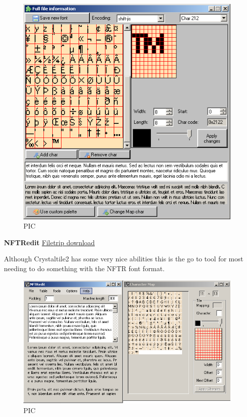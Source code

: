 \documentclass[
]{book}
\begin{document}
\begin{figure}
\centering
\includegraphics{images/115_home_fast6191_romhackingguide_unrenamed_fil___inal_borders_romhackingguidefontnftrtinke_1.png}
\caption{PIC}
\end{figure}

\textbf{NFTRedit} \href{http://filetrip.net/nds-downloads/utilities/download-nftredit-19-f29196.html}{Filetrip download}

Although Crystaltile2 has some very nice abilities this is the go to tool for most needing to do something with the NFTR font format.

\begin{figure}
\centering
\includegraphics{images/116_home_fast6191_romhackingguide_unrenamed_files_and_original_borders_romhackingguidenftredit1.png}
\caption{PIC}
\end{figure}
\end{document}
